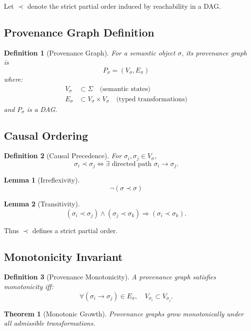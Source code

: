 \documentclass[11pt]{article}
\newtheorem{definition}{Definition}
\newtheorem{theorem}{Theorem}
\newtheorem{lemma}{Lemma}
\begin{document}
Let $\prec$ denote the strict partial order induced by reachability in a DAG.

\subsection{Provenance Graph Definition}

\begin{definition}[Provenance Graph]
For a semantic object $\sigma$, its provenance graph is
\[
P_\sigma = (V_\sigma, E_\sigma)
\]
where:
\begin{align*}
V_\sigma &\subset \Sigma \quad \text{(semantic states)} \\
E_\sigma &\subset V_\sigma \times V_\sigma \quad \text{(typed transformations)}
\end{align*}
and $P_\sigma$ is a DAG.
\end{definition}

\subsection{Causal Ordering}

\begin{definition}[Causal Precedence]
For $\sigma_i, \sigma_j \in V_\sigma$,
\[
\sigma_i \prec \sigma_j \iff \exists \text{ directed path } \sigma_i \to \sigma_j.
\]
\end{definition}

\begin{lemma}[Irreflexivity]
\[
\neg(\sigma \prec \sigma)
\]
\end{lemma}

\begin{lemma}[Transitivity]
\[
(\sigma_i \prec \sigma_j) \wedge (\sigma_j \prec \sigma_k) \Rightarrow (\sigma_i \prec \sigma_k).
\]
\end{lemma}

Thus $\prec$ defines a strict partial order.

\subsection{Monotonicity Invariant}

\begin{definition}[Provenance Monotonicity]
A provenance graph satisfies monotonicity iff:
\[
\forall (\sigma_i \to \sigma_j) \in E_\sigma,\quad
V_{\sigma_i} \subset V_{\sigma_j}.
\]
\end{definition}

\begin{theorem}[Monotonic Growth]
Provenance graphs grow monotonically under all admissible transformations.
\end{theorem}
\end{document}
